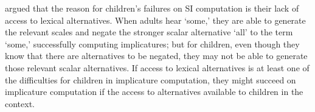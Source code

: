\documentclass[10pt,letterpaper]{article}
\begin{document}

 argued that the reason for children's failures on SI computation is their lack of access to lexical alternatives. When adults hear `some,' they are able to generate the relevant scales and negate the stronger scalar alternative `all' to the term `some,' successfully computing implicatures; but for children, even though they know that there are alternatives to be negated, they may not be able to generate those relevant scalar alternatives. If access to lexical alternatives is at least one of the difficulties for children in implicature computation, they might succeed on implicature computation if the access to alternatives available to children in the context. 
\end{document}
